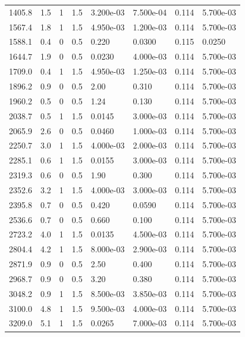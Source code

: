 \documentclass[preview]{standalone}
\begin{document}
{{\begin{tabular}{L{1.2cm}C{1.2cm} C{0.3cm}C{0.5cm} C{1.4cm}C{1.4cm} C{1.4cm}C{1.4cm}}
  1405.8  &   1.5  & 1     & 1.5 &  3.200e-03  & 7.500e-04  & 0.114 &  5.700e-03   \\ 
  1567.4  &   1.8  & 1     & 1.5 &  4.950e-03  & 1.200e-03  & 0.114 &  5.700e-03   \\ 
  1588.1  &   0.4  & 0     & 0.5 &  0.220  & 0.0300  & 0.115 &  0.0250   \\ 
  1644.7  &   1.9  & 0     & 0.5 &  0.0230  & 4.000e-03  & 0.114 &  5.700e-03   \\ 
  1709.0  &   0.4  & 1     & 1.5 &  4.950e-03  & 1.250e-03  & 0.114 &  5.700e-03   \\ 
  1896.2  &   0.9  & 0     & 0.5 &  2.00  & 0.310  & 0.114 &  5.700e-03   \\ 
  1960.2  &   0.5  & 0     & 0.5 &  1.24  & 0.130  & 0.114 &  5.700e-03   \\ 
  2038.7  &   0.5  & 1     & 1.5 &  0.0145  & 3.000e-03  & 0.114 &  5.700e-03   \\ 
  2065.9  &   2.6  & 0     & 0.5 &  0.0460  & 1.000e-03  & 0.114 &  5.700e-03   \\ 
  2250.7  &   3.0  & 1     & 1.5 &  4.000e-03  & 2.000e-03  & 0.114 &  5.700e-03   \\ 
  2285.1  &   0.6  & 1     & 1.5 &  0.0155  & 3.000e-03  & 0.114 &  5.700e-03   \\ 
  2319.3  &   0.6  & 0     & 0.5 &  1.90  & 0.300  & 0.114 &  5.700e-03   \\ 
  2352.6  &   3.2  & 1     & 1.5 &  4.000e-03  & 3.000e-03  & 0.114 &  5.700e-03   \\ 
  2395.8  &   0.7  & 0     & 0.5 &  0.420  & 0.0590  & 0.114 &  5.700e-03   \\ 
  2536.6  &   0.7  & 0     & 0.5 &  0.660  & 0.100  & 0.114 &  5.700e-03   \\ 
  2723.2  &   4.0  & 1     & 1.5 &  0.0135  & 4.500e-03  & 0.114 &  5.700e-03   \\ 
  2804.4  &   4.2  & 1     & 1.5 &  8.000e-03  & 2.900e-03  & 0.114 &  5.700e-03   \\ 
  2871.9  &   0.9  & 0     & 0.5 &  2.50  & 0.400  & 0.114 &  5.700e-03   \\ 
  2968.7  &   0.9  & 0     & 0.5 &  3.20  & 0.380  & 0.114 &  5.700e-03   \\ 
  3048.2  &   0.9  & 1     & 1.5 &  8.500e-03  & 3.850e-03  & 0.114 &  5.700e-03   \\ 
  3100.0  &   4.8  & 1     & 1.5 &  9.500e-03  & 4.000e-03  & 0.114 &  5.700e-03   \\ 
  3209.0  &   5.1  & 1     & 1.5 &  0.0265  & 7.000e-03  & 0.114 &  5.700e-03   \\ 

\end{tabular}}}
\end{document}
